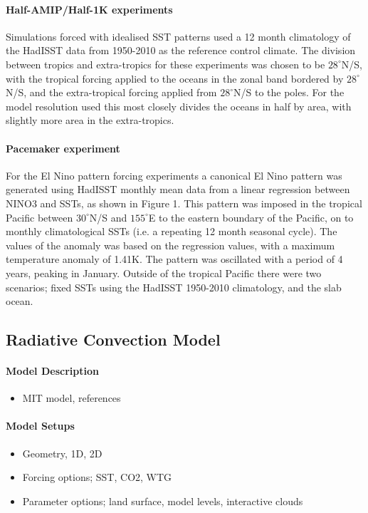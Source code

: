 \paragraph{Half-AMIP/Half-1K experiments}
Simulations forced with idealised SST patterns used a 12 month climatology of 
the HadISST data from 1950-2010 as the reference control climate. The division 
between tropics and extra-tropics for these experiments was chosen to be 
$28^{\circ}$N/S, with the tropical forcing applied to the oceans in the zonal 
band bordered by $28^{\circ}$N/S, and the extra-tropical forcing applied from 
$28^{\circ}$N/S to the poles. For the model resolution used this most closely 
divides the oceans in half by area, with slightly more area in the 
extra-tropics.

\paragraph{Pacemaker experiment}
For the El Nino pattern forcing experiments a canonical El Nino pattern was 
generated using HadISST monthly mean data from a linear regression between NINO3 
and SSTs, as shown in Figure 1. This pattern was imposed in the tropical Pacific 
between $30^{\circ}$N/S and $155^{\circ}$E to the eastern boundary of the 
Pacific, on to monthly climatological SSTs (i.e. a repeating 12 month seasonal 
cycle).  The values of the anomaly was based on the regression values, with a 
maximum temperature anomaly of 1.41K.  The pattern was oscillated with a period 
of 4 years, peaking in January.  Outside of the tropical Pacific there were two 
scenarios; fixed SSTs using the HadISST 1950-2010 climatology, and the slab 
ocean. 



\subsection{Radiative Convection Model}

\paragraph{Model Description}
\begin{itemize}
	\item MIT model, references
\end{itemize}

\paragraph{Model Setups}
\begin{itemize}
	\item Geometry, 1D, 2D
	\item Forcing options; SST, CO2, WTG
	\item Parameter options; land surface, model levels, interactive clouds
\end{itemize}

